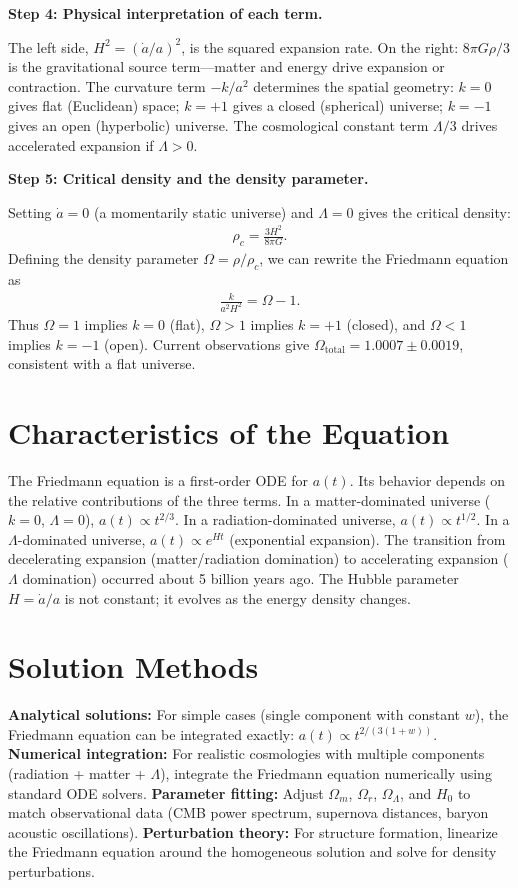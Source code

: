 \textbf{Step 4: Physical interpretation of each term.}

The left side, $H^2 = (\dot{a}/a)^2$, is the squared expansion rate. On the right: $8\pi G\rho/3$ is the gravitational source term---matter and energy drive expansion or contraction. The curvature term $-k/a^2$ determines the spatial geometry: $k = 0$ gives flat (Euclidean) space; $k = +1$ gives a closed (spherical) universe; $k = -1$ gives an open (hyperbolic) universe. The cosmological constant term $\Lambda/3$ drives accelerated expansion if $\Lambda > 0$.

\textbf{Step 5: Critical density and the density parameter.}

Setting $\dot{a} = 0$ (a momentarily static universe) and $\Lambda = 0$ gives the critical density:
\begin{align}
\rho_c = \frac{3H^2}{8\pi G}.
\end{align}
Defining the density parameter $\Omega = \rho/\rho_c$, we can rewrite the Friedmann equation as
\begin{align}
\frac{k}{a^2 H^2} = \Omega - 1.
\end{align}
Thus $\Omega = 1$ implies $k = 0$ (flat), $\Omega > 1$ implies $k = +1$ (closed), and $\Omega < 1$ implies $k = -1$ (open). Current observations give $\Omega_{\text{total}} = 1.0007 \pm 0.0019$, consistent with a flat universe.

\section*{Characteristics of the Equation}

The Friedmann equation is a first-order ODE for $a(t)$. Its behavior depends on the relative contributions of the three terms. In a matter-dominated universe ($k = 0$, $\Lambda = 0$), $a(t) \propto t^{2/3}$. In a radiation-dominated universe, $a(t) \propto t^{1/2}$. In a $\Lambda$-dominated universe, $a(t) \propto e^{Ht}$ (exponential expansion). The transition from decelerating expansion (matter/radiation domination) to accelerating expansion ($\Lambda$ domination) occurred about 5 billion years ago. The Hubble parameter $H = \dot{a}/a$ is not constant; it evolves as the energy density changes.
\section*{Solution Methods}

\textbf{Analytical solutions:} For simple cases (single component with constant $w$), the Friedmann equation can be integrated exactly: $a(t) \propto t^{2/(3(1+w))}$. \textbf{Numerical integration:} For realistic cosmologies with multiple components (radiation + matter + $\Lambda$), integrate the Friedmann equation numerically using standard ODE solvers. \textbf{Parameter fitting:} Adjust $\Omega_m$, $\Omega_r$, $\Omega_\Lambda$, and $H_0$ to match observational data (CMB power spectrum, supernova distances, baryon acoustic oscillations). \textbf{Perturbation theory:} For structure formation, linearize the Friedmann equation around the homogeneous solution and solve for density perturbations.
